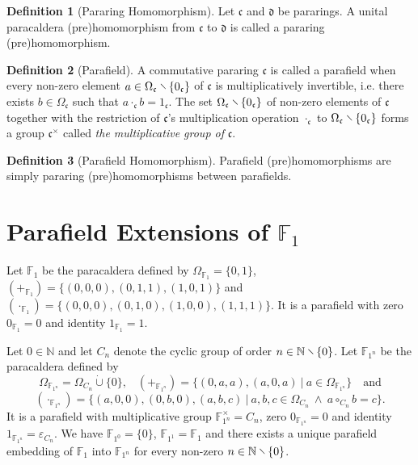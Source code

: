 \documentclass{article}
\theoremstyle{definition}
\newtheorem{definition}{Definition}[section]
\newcommand{\conj}{~\land~}
\newcommand{\diff}{\mathbin{\hspace{-.2em}\raisebox{.06em}{\rotatebox[origin=c]{-45}{$-$}\hspace{-.24em}}}}
\newcommand{\eps}{\varepsilon}
\begin{document}

\begin{definition}[Pararing Homomorphism]
Let \(\mathfrak{c}\) and \(\mathfrak{d}\) be pararings. A unital paracaldera (pre)homomorphism from \(\mathfrak{c}\) to \(\mathfrak{d}\) is called a pararing (pre)homomorphism.
\end{definition}

\begin{definition}[Parafield]
A commutative pararing \(\mathfrak{c}\) is called a parafield when every non-zero element \(a\in\Omega_\mathfrak{c}\diff\{0_\mathfrak{c}\}\) of \(\mathfrak{c}\) is multiplicatively invertible, i.e. there exists \(b\in\Omega_\mathfrak{c}\) such that \(a\cdot_\mathfrak{c}b=1_\mathfrak{c}\). The set \(\Omega_\mathfrak{c}\diff\{0_\mathfrak{c}\}\) of non-zero elements of \(\mathfrak{c}\) together with the restriction of \(\mathfrak{c}\)'s multiplication operation \(\cdot_\mathfrak{c}\) to \(\Omega_\mathfrak{c}\diff\{0_\mathfrak{c}\}\) forms a group \(\mathfrak{c}^\times\) called \textit{the multiplicative group of} \(\mathfrak{c}\).
\end{definition}

\begin{definition}[Parafield Homomorphism]
Parafield (pre)homomorphisms are simply pararing (pre)homomorphisms between parafields.
\end{definition}

\section{Parafield Extensions of \texorpdfstring{\(\mathbb{F}_1\)}{F1}}

Let \(\mathbb{F}_1\) be the paracaldera defined by \(\Omega_{\mathbb{F}_1}=\{0,1\}\), \((+_{\mathbb{F}_1})=\{(0,0,0),(0,1,1),(1,0,1)\}\) and \((\cdot_{\mathbb{F}_1})=\{(0,0,0),(0,1,0),(1,0,0),(1,1,1)\}\). It is a parafield with zero
\(0_{\mathbb{F}_1}=0\) and identity \(1_{\mathbb{F}_1}=1\).

Let \(0\in\mathbb{N}\) and let \(C_n\) denote the cyclic group of order \(n\in\mathbb{N}\diff\{0\}\). Let \(\mathbb{F}_{1^n}\) be the paracaldera defined by \[\Omega_{\mathbb{F}_{1^n}}=\Omega_{C_n}\mathbin{\dot\cup}\{0\}\text{,}\quad(+_{\mathbb{F}_{1^n}})=\{(0,a,a),(a,0,a)~|~a\in\Omega_{\mathbb{F}_{1^n}}\}\quad\text{and}\]\[(\cdot_{\mathbb{F}_{1^n}})=\{(a,0,0),(0,b,0),(a,b,c)~|~a,b,c\in\Omega_{C_n}\conj a\circ_{C_n}b=c\}\text{.}\] It is a parafield with multiplicative group \(\mathbb{F}_{1^n}^\times=C_n\), zero \(0_{\mathbb{F}_{1^n}}=0\) and identity \(1_{\mathbb{F}_{1^n}}=\eps_{C_n}\). We have \(\mathbb{F}_{1^0}=\{0\}\), \(\mathbb{F}_{1^1}=\mathbb{F}_1\) and there exists a unique parafield embedding of \(\mathbb{F}_{1}\) into \(\mathbb{F}_{1^n}\) for every non-zero \(n\in\mathbb{N}\diff\{0\}\).
\end{document}
